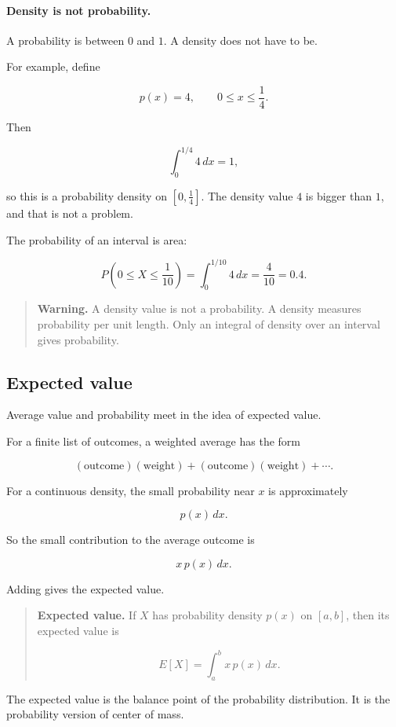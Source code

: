 \paragraph{Density is not probability.}
A probability is between \(0\) and \(1\).  A density does not have to be.

For example, define

\[
p(x)=4,
\qquad 0\le x\le\frac14.
\]

Then

\[
\int_0^{1/4}4\,dx=1,
\]

so this is a probability density on \([0,\frac14]\).  The density value \(4\) is bigger
than \(1\), and that is not a problem.

The probability of an interval is area:

\[
P\left(0\le X\le \frac{1}{10}\right)
=
\int_0^{1/10}4\,dx
=
\frac{4}{10}
=
0.4.
\]

\begin{quote}
\textbf{Warning.}
A density value is not a probability.  A density measures probability per unit length.
Only an integral of density over an interval gives probability.
\end{quote}

\subsection{Expected value}
\label{subsec:expected-value}

Average value and probability meet in the idea of expected value.

For a finite list of outcomes, a weighted average has the form

\[
(\text{outcome})(\text{weight})
+
(\text{outcome})(\text{weight})
+
\cdots.
\]

For a continuous density, the small probability near \(x\) is approximately

\[
p(x)\,dx.
\]

So the small contribution to the average outcome is

\[
x\,p(x)\,dx.
\]

Adding gives the expected value.

\begin{quote}
\textbf{Expected value.}
If \(X\) has probability density \(p(x)\) on \([a,b]\), then its expected value is

\[
\boxed{
E[X]=\int_a^b x\,p(x)\,dx.
}
\]
\end{quote}

The expected value is the balance point of the probability distribution.  It is the
probability version of center of mass.

